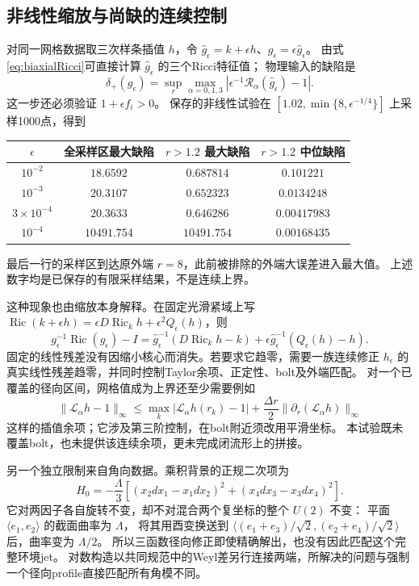 \documentclass[UTF8,a4paper,11pt,fontset=fandol]{ctexart}
\numberwithin{equation}{section}
\theoremstyle{definition}
\newcommand{\Ric}{\operatorname{Ric}}
\begin{document}
\subsection{非线性缩放与尚缺的连续控制}
对同一网格数据取三次样条插值 $h$，令
$\widehat g_\epsilon=k+\epsilon h$、$g_\epsilon=\epsilon\widehat g_\epsilon$。
由式\eqref{eq:biaxialRicci}可直接计算 $\widehat g_\epsilon$ 的三个Ricci特征值；
物理输入的缺陷是
\begin{equation}\label{eq:eh-ls-physical}
\delta_+(g_\epsilon)
=\sup_r\max_{\alpha=0,1,3}
\left|\epsilon^{-1}\mathscr R_\alpha(\widehat g_\epsilon)-1\right|.
\end{equation}
这一步还必须验证 $1+\epsilon f_i>0$。
保存的非线性试验在
$[1.02,\min\{8,\epsilon^{-1/4}\}]$ 上采样1000点，得到
\begin{center}
\small
\begin{tabular}{c c c c}
\toprule
$\epsilon$ & 全采样区最大缺陷 & $r>1.2$ 最大缺陷 & $r>1.2$ 中位缺陷\\\midrule
$10^{-2}$ & $18.6592$ & $0.687814$ & $0.101221$\\
$10^{-3}$ & $20.3107$ & $0.652323$ & $0.0134248$\\
$3\times10^{-4}$ & $20.3633$ & $0.646286$ & $0.00417983$\\
$10^{-4}$ & $10491.754$ & $10491.754$ & $0.00168435$\\\bottomrule
\end{tabular}
\end{center}
最后一行的采样区到达原外端 $r=8$，此前被排除的外端大误差进入最大值。
上述数字均是已保存的有限采样结果，不是连续上界。

这种现象也由缩放本身解释。在固定光滑紧域上写
$\Ric(k+\epsilon h)=\epsilon D\Ric_kh+\epsilon^2Q_\epsilon(h)$，则
\begin{equation}\label{eq:eh-ls-linear-floor}
g_\epsilon^{-1}\Ric(g_\epsilon)-I
=\widehat g_\epsilon^{-1}(D\Ric_kh-k)
+\epsilon\widehat g_\epsilon^{-1}(Q_\epsilon(h)-h).
\end{equation}
固定的线性残差没有因缩小核心而消失。若要求它趋零，需要一族连续修正
$h_\epsilon$ 的真实线性残差趋零，并同时控制Taylor余项、正定性、bolt及外端匹配。
对一个已覆盖的径向区间，网格值成为上界还至少需要例如
\[
\|\mathscr L_\alpha h-1\|_\infty
\le\max_k|\mathscr L_\alpha h(r_k)-1|
+\frac{\Delta r}{2}\|\partial_r(\mathscr L_\alpha h)\|_\infty
\]
这样的插值余项；它涉及第三阶控制，在bolt附近须改用平滑坐标。
本试验既未覆盖bolt，也未提供该连续余项，更未完成闭流形上的拼接。

另一个独立限制来自角向数据。乘积背景的正规二次项为
\begin{equation}\label{eq:product-quadratic-jet}
H_0=-\frac\Lambda3\left[
(x_2dx_1-x_1dx_2)^2+(x_4dx_3-x_3dx_4)^2\right].
\end{equation}
它对两因子各自旋转不变，却不对混合两个复坐标的整个 $U(2)$ 不变：
平面 $\langle e_1,e_2\rangle$ 的截面曲率为 $\Lambda$，
将其用酉变换送到
$\langle(e_1+e_3)/\sqrt2,(e_2+e_4)/\sqrt2\rangle$ 后，曲率变为 $\Lambda/2$。
所以三函数径向修正即使精确解出，也没有因此匹配这个完整环境jet。
对数构造以共同规范中的Weyl差另行连接两端，所解决的问题与强制一个径向profile直接匹配所有角模不同。
\end{document}
